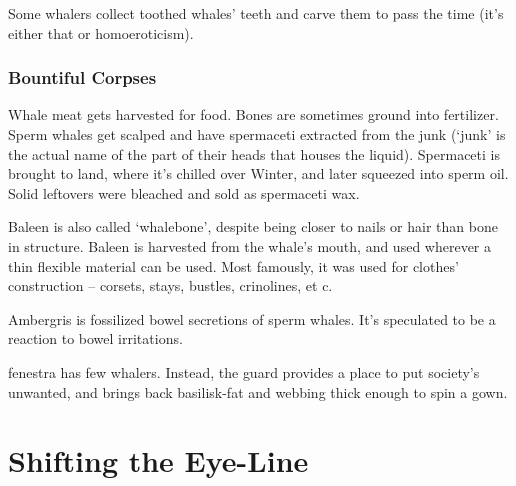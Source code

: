 \begin{multicols}{2}
Some whalers collect toothed whales' teeth and carve them to pass the time (it's either that or homoeroticism).

\subsubsection{Bountiful Corpses}

Whale meat gets harvested for food.
Bones are sometimes ground into fertilizer.
Sperm whales get scalped and have spermaceti extracted from the junk
(`junk' is the actual name of the part of their heads that houses the liquid).
Spermaceti is brought to land, where it's chilled over Winter, and later squeezed into sperm oil.
Solid leftovers were bleached and sold as spermaceti wax.

Baleen is also called `whalebone', despite being closer to nails or hair than bone in structure.
Baleen is harvested from the whale's mouth, and used wherever a thin flexible material can be used.
Most famously, it was used for clothes' construction -- corsets, stays, bustles, crinolines, et c.

Ambergris is fossilized bowel secretions of sperm whales.
It's speculated to be a reaction to bowel irritations.

\end{multicols}

\Gls{fenestra} has few whalers.
Instead, the \gls{guard} provides a place to put society's unwanted, and brings back basilisk-fat and webbing thick enough to spin a gown.

\clearpage

\section*{Shifting the Eye-Line}

